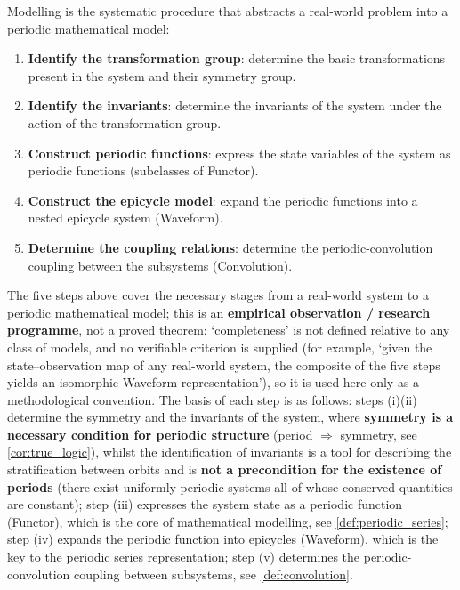 \begin{definition}\label{def:modelling_steps}
Modelling is the systematic procedure that abstracts a real-world problem into a periodic mathematical model:
\begin{enumerate}[label=(\roman*)]
    \item \textbf{Identify the transformation group}: determine the basic transformations present in the system and their symmetry group.
    \item \textbf{Identify the invariants}: determine the invariants of the system under the action of the transformation group.
    \item \textbf{Construct periodic functions}: express the state variables of the system as periodic functions (subclasses of Functor).
    \item \textbf{Construct the epicycle model}: expand the periodic functions into a nested epicycle system (Waveform).
    \item \textbf{Determine the coupling relations}: determine the periodic-convolution coupling between the subsystems (Convolution).
\end{enumerate}
\end{definition}

\begin{remark}\label{prop:modelling_completeness}
The five steps above cover the necessary stages from a real-world system to a periodic mathematical model; this is an \textbf{empirical observation / research programme}, not a proved theorem: `completeness' is not defined relative to any class of models, and no verifiable criterion is supplied (for example, `given the state--observation map of any real-world system, the composite of the five steps yields an isomorphic Waveform representation'), so it is used here only as a methodological convention.
The basis of each step is as follows: steps (i)(ii) determine the symmetry and the invariants of the system, where \textbf{symmetry is a necessary condition for periodic structure} (period $\Rightarrow$ symmetry, see \cref{cor:true_logic}), whilst the identification of invariants is a tool for describing the stratification between orbits and is \textbf{not a precondition for the existence of periods} (there exist uniformly periodic systems all of whose conserved quantities are constant); step (iii) expresses the system state as a periodic function (Functor), which is the core of mathematical modelling, see \cref{def:periodic_series}; step (iv) expands the periodic function into epicycles (Waveform), which is the key to the periodic series representation; step (v) determines the periodic-convolution coupling between subsystems, see \cref{def:convolution}.
\end{remark}

